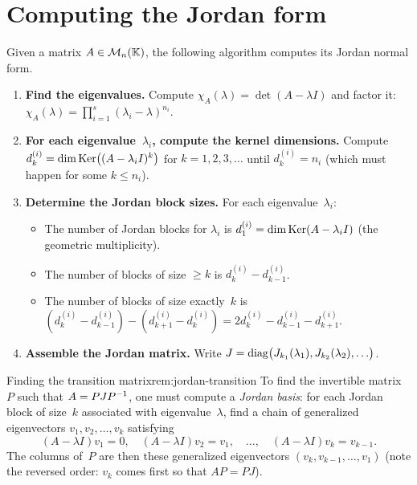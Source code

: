 \section{Computing the Jordan form}\label{sec:computing-jordan}

Given a matrix $A \in \mathcal{M}_n({\mathbb{K}})$, the following algorithm computes
its Jordan normal form.

\begin{enumerate}[label=\textbf{Step \arabic*:},leftmargin=3cm]
  \item \textbf{Find the eigenvalues.}
    Compute $\chi_A(\lambda) = \det(A - \lambda I)$ and factor it:
    $\chi_A(\lambda) = \prod_{i=1}^s (\lambda_i - \lambda)^{n_i}$.

  \item \textbf{For each eigenvalue~$\lambda_i$, compute the kernel
    dimensions.}
    Compute $d_k^{(i)} = \dim\operatorname{Ker}\bigl((A - \lambda_i I)^k\bigr)$
    for $k = 1, 2, 3, \ldots$ until $d_k^{(i)} = n_i$ (which must
    happen for some $k \leq n_i$).

  \item \textbf{Determine the Jordan block sizes.}
    For each eigenvalue~$\lambda_i$:
    \begin{itemize}
      \item The number of Jordan blocks for $\lambda_i$ is
        $d_1^{(i)} = \dim\operatorname{Ker}(A - \lambda_i I)$ (the geometric
        multiplicity).
      \item The number of blocks of size $\geq k$ is
        $d_k^{(i)} - d_{k-1}^{(i)}$.
      \item The number of blocks of size exactly~$k$ is
        $(d_k^{(i)} - d_{k-1}^{(i)}) - (d_{k+1}^{(i)} - d_k^{(i)})
        = 2d_k^{(i)} - d_{k-1}^{(i)} - d_{k+1}^{(i)}$.
    \end{itemize}

  \item \textbf{Assemble the Jordan matrix.}
    Write $J = \operatorname{diag}\bigl(J_{k_1}(\lambda_1), J_{k_2}(\lambda_2),
    \ldots\bigr)$.
\end{enumerate}

\begin{remark}{Finding the transition matrix}{rem:jordan-transition}
To find the invertible matrix~$P$ such that $A = P J {P}^{-1}$, one
must compute a \emph{Jordan basis}: for each Jordan block of
size~$k$ associated with eigenvalue~$\lambda$, find a chain of
generalized eigenvectors $v_1, v_2, \ldots, v_k$ satisfying
\[
  (A - \lambda I)v_1 = 0, \quad
  (A - \lambda I)v_2 = v_1, \quad
  \ldots, \quad
  (A - \lambda I)v_k = v_{k-1}.
\]
The columns of~$P$ are then these generalized eigenvectors
$(v_k, v_{k-1}, \ldots, v_1)$ (note the reversed order: $v_k$ comes
first so that $AP = PJ$).
\end{remark}



